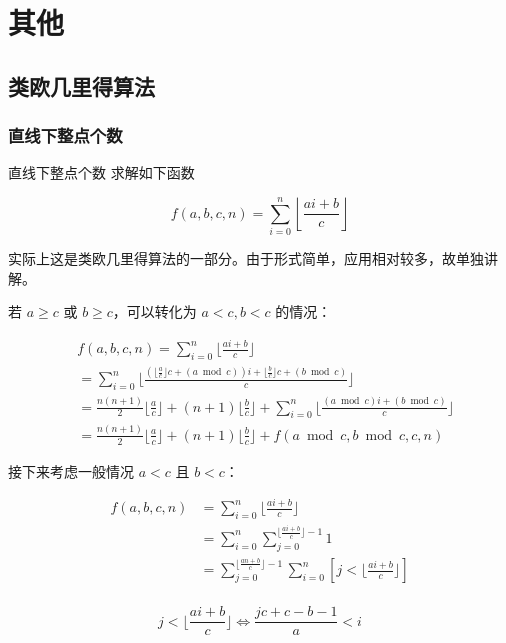 \documentclass[../main.tex]{subfiles}
\begin{document}
\section{其他}

\subsection{类欧几里得算法}

\subsubsection{直线下整点个数}

\begin{frame}{直线下整点个数}
求解如下函数

$$
f(a,b,c,n)=\sum_{i=0}^n\left\lfloor\frac{ai+b}{c} \right\rfloor
$$\pause

实际上这是类欧几里得算法的一部分。由于形式简单，应用相对较多，故单独讲解。
\end{frame}

\begin{frame}
若 $a\ge c$ 或 $b\ge c$，可以转化为 $a<c,b<c$ 的情况：

$$
\begin{aligned}
&f(a,b,c,n)=\sum_{i=0}^n\lfloor\frac{ai+b}{c}\rfloor\\
&=\sum_{i=0}^n\lfloor\frac{(\lfloor\frac{a}{c}\rfloor c+(a\bmod c))i+\lfloor\frac{b}{c}\rfloor c+(b\bmod c)}{c}\rfloor\\
&=\frac{n(n+1)}{2}\lfloor\frac{a}{c}\rfloor+(n+1)\lfloor\frac{b}{c}\rfloor+\sum_{i=0}^n\lfloor\frac{(a\bmod c)i+(b\bmod c)}{c}\rfloor\\
&=\frac{n(n+1)}{2}\lfloor\frac{a}{c}\rfloor+(n+1)\lfloor\frac{b}{c}\rfloor+f(a\bmod c,b\bmod c,c,n)
\end{aligned}
$$
\end{frame}

\begin{frame}
接下来考虑一般情况 $a<c$ 且 $b<c$：

$$
\begin{aligned}
f(a,b,c,n)&=\sum_{i=0}^n\lfloor\frac{ai+b}{c}\rfloor\\
&=\sum_{i=0}^n\sum_{j=0}^{\lfloor\frac{ai+b}{c}\rfloor-1}1\\
&=\sum_{j=0}^{\lfloor\frac{an+b}{c}\rfloor-1}\sum_{i=0}^n[j<\lfloor\frac{ai+b}{c}\rfloor]\\
\end{aligned}
$$\pause

$$
j<\lfloor\frac{ai+b}{c}\rfloor\iff\frac{jc+c-b-1}{a}<i
$$
\end{frame}
\end{document}
